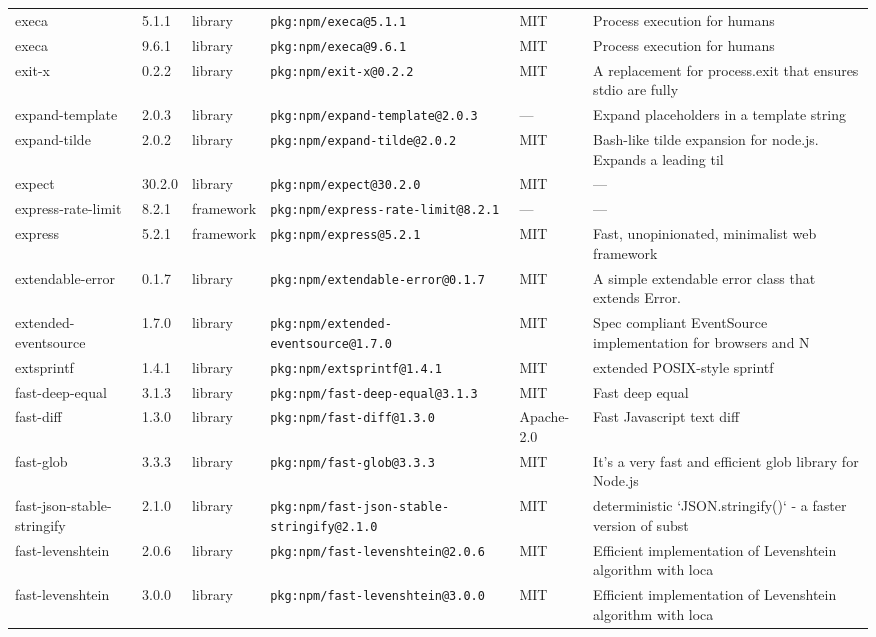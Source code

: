 \documentclass[11pt]{article}
\begin{document}
\begin{longtable}{|l|l|l|p{2.2cm}|l|p{4cm}|}
execa & 5.1.1 & library & \texttt{pkg:npm/execa@5.1.1} & MIT & Process execution for humans \\
execa & 9.6.1 & library & \texttt{pkg:npm/execa@9.6.1} & MIT & Process execution for humans \\
exit-x & 0.2.2 & library & \texttt{pkg:npm/exit-x@0.2.2} & MIT & A replacement for process.exit that ensures stdio are fully  \\
expand-template & 2.0.3 & library & \texttt{pkg:npm/expand-template@2.0.3} & — & Expand placeholders in a template string \\
expand-tilde & 2.0.2 & library & \texttt{pkg:npm/expand-tilde@2.0.2} & MIT & Bash-like tilde expansion for node.js. Expands a leading til \\
expect & 30.2.0 & library & \texttt{pkg:npm/expect@30.2.0} & MIT & — \\
express-rate-limit & 8.2.1 & framework & \texttt{pkg:npm/express-rate-limit@8.2.1} & — & — \\
express & 5.2.1 & framework & \texttt{pkg:npm/express@5.2.1} & MIT & Fast, unopinionated, minimalist web framework \\
extendable-error & 0.1.7 & library & \texttt{pkg:npm/extendable-error@0.1.7} & MIT & A simple extendable error class that extends Error. \\
extended-eventsource & 1.7.0 & library & \texttt{pkg:npm/extended-eventsource@1.7.0} & MIT & Spec compliant EventSource implementation for browsers and N \\
extsprintf & 1.4.1 & library & \texttt{pkg:npm/extsprintf@1.4.1} & MIT & extended POSIX-style sprintf \\
fast-deep-equal & 3.1.3 & library & \texttt{pkg:npm/fast-deep-equal@3.1.3} & MIT & Fast deep equal \\
fast-diff & 1.3.0 & library & \texttt{pkg:npm/fast-diff@1.3.0} & Apache-2.0 & Fast Javascript text diff \\
fast-glob & 3.3.3 & library & \texttt{pkg:npm/fast-glob@3.3.3} & MIT & It's a very fast and efficient glob library for Node.js \\
fast-json-stable-stringify & 2.1.0 & library & \texttt{pkg:npm/fast-json-stable-stringify@2.1.0} & MIT & deterministic `JSON.stringify()` - a faster version of subst \\
fast-levenshtein & 2.0.6 & library & \texttt{pkg:npm/fast-levenshtein@2.0.6} & MIT & Efficient implementation of Levenshtein algorithm  with loca \\
fast-levenshtein & 3.0.0 & library & \texttt{pkg:npm/fast-levenshtein@3.0.0} & MIT & Efficient implementation of Levenshtein algorithm  with loca \\

\end{longtable}
\end{document}
